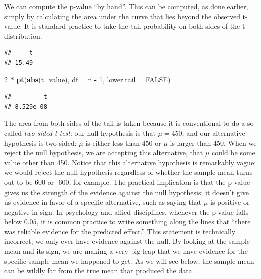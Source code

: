 \documentclass[12pt,]{krantz}
\newenvironment{Shaded}{\begin{snugshade}}{\end{snugshade}}
\newcommand{\DataTypeTok}[1]{\textcolor[rgb]{0.13,0.29,0.53}{#1}}
\newcommand{\DecValTok}[1]{\textcolor[rgb]{0.00,0.00,0.81}{#1}}
\newcommand{\KeywordTok}[1]{\textcolor[rgb]{0.13,0.29,0.53}{\textbf{#1}}}
\newcommand{\NormalTok}[1]{#1}
\newcommand{\OperatorTok}[1]{\textcolor[rgb]{0.81,0.36,0.00}{\textbf{#1}}}
\newcommand{\OtherTok}[1]{\textcolor[rgb]{0.56,0.35,0.01}{#1}}
\newcommand{\StringTok}[1]{\textcolor[rgb]{0.31,0.60,0.02}{#1}}
\begin{document}
We can compute the p-value ``by hand''. This can be computed, as done earlier, simply by calculating the area under the curve that lies beyond the observed t-value. It is standard practice to take the tail probability on both sides of the t-distribution.

\begin{Shaded}
\end{Shaded}

\begin{verbatim}
##     t 
## 15.49
\end{verbatim}

\begin{Shaded}
\begin{Highlighting}[]
\DecValTok{2} \OperatorTok{*}\StringTok{ }\KeywordTok{pt}\NormalTok{(}\KeywordTok{abs}\NormalTok{(t_value), }\DataTypeTok{df =}\NormalTok{ n }\OperatorTok{-}\StringTok{ }\DecValTok{1}\NormalTok{, }\DataTypeTok{lower.tail =} \OtherTok{FALSE}\NormalTok{)}
\end{Highlighting}
\end{Shaded}

\begin{verbatim}
##         t 
## 8.529e-08
\end{verbatim}

The area from both sides of the tail is taken because it is conventional to do a so-called \emph{two-sided t-test}: our null hypothesis is that \(\mu=450\), and our alternative hypothesis is two-sided: \(\mu\) is either less than 450 or \(\mu\) is larger than 450. When we reject the null hypothesis, we are accepting this alternative, that \(\mu\) could be some value other than 450. Notice that this alternative hypothesis is remarkably vague; we would reject the null hypothesis regardless of whether the sample mean turns out to be 600 or -600, for example. The practical implication is that the p-value gives us the strength of the evidence against the null hypothesis; it doesn't give us evidence in favor of a specific alternative, such as saying that \(\mu\) is positive or negative in sign. In psychology and allied disciplines, whenever the p-value falls below \(0.05\), it is common practice to write something along the lines that ``there was reliable evidence for the predicted effect.'' This statement is technically incorrect; we only ever have evidence against the null. By looking at the sample mean and its sign, we are making a very big leap that we have evidence for the specific sample mean we happened to get. As we will see below, the sample mean can be wildly far from the true mean that produced the data.
\end{document}
